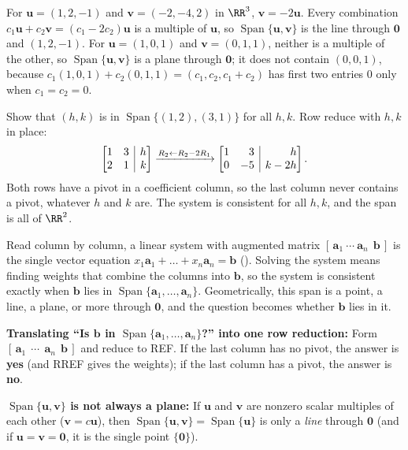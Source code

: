 \documentclass[10pt]{scrartcl}
\makeatletter
\newcommand{\aug}[2]{\left[\begin{array}{@{}#1@{}}#2\end{array}\right]}
\newcommand{\vv}[1]{\mathbf{#1}}
\DeclareMathOperator{\spn}{Span}
\makeatother
\begin{document}
\begin{example*}
For $\vv u=(1,2,-1)$ and $\vv v=(-2,-4,2)$ in $\RR^3$, $\vv v=-2\vv u$. Every combination $c_1\vv u+c_2\vv v=(c_1-2c_2)\vv u$ is a multiple of $\vv u$, so $\spn\{\vv u,\vv v\}$ is the line through $\vv 0$ and $(1,2,-1)$. For $\vv u=(1,0,1)$ and $\vv v=(0,1,1)$, neither is a multiple of the other, so $\spn\{\vv u,\vv v\}$ is a plane through $\vv 0$; it does not contain $(0,0,1)$, because $c_1(1,0,1)+c_2(0,1,1)=(c_1,c_2,c_1+c_2)$ has first two entries $0$ only when $c_1=c_2=0$.
\end{example*}

\begin{example*}
Show that $(h,k)$ is in $\spn\{(1,2),(3,1)\}$ for all $h,k$. Row reduce with $h,k$ in place:
\[
  \aug{rr|r}{1&3&h\\2&1&k}\xrightarrow{R_2\leftarrow R_2-2R_1}\aug{rr|r}{1&3&h\\0&-5&k-2h}.
\]
Both rows have a pivot in a coefficient column, so the last column never contains a pivot, whatever $h$ and $k$ are. The system is consistent for all $h,k$, and the span is all of $\RR^2$.
\end{example*}

\revisit
Read column by column, a linear system with augmented matrix $[\,\vv a_1\ \cdots\ \vv a_n\ \ \vv b\,]$ is the single vector equation $x_1\vv a_1+\dots+x_n\vv a_n=\vv b$ (). Solving the system means finding weights that combine the columns into $\vv b$, so the system is consistent exactly when $\vv b$ lies in $\spn\{\vv a_1,\dots,\vv a_n\}$. Geometrically, this span is a point, a line, a plane, or more through $\vv 0$, and the question becomes whether $\vv b$ lies in it.

\begin{shortcuts}
  \ii \textbf{Translating ``Is $\vv b$ in $\spn\{\vv a_1,\dots,\vv a_n\}$?'' into one row reduction:} Form $[\,\vv a_1\ \ \cdots\ \ \vv a_n\ \ \vv b\,]$ and reduce to REF. If the last column has no pivot, the answer is \textbf{yes} (and RREF gives the weights); if the last column has a pivot, the answer is \textbf{no}.
\end{shortcuts}

\begin{trapbox}
  \ii \textbf{$\spn\{\vv u,\vv v\}$ is not always a plane:} If $\vv u$ and $\vv v$ are nonzero scalar multiples of each other ($\vv v=c\vv u$), then $\spn\{\vv u,\vv v\}=\spn\{\vv u\}$ is only a \emph{line} through $\vv 0$ (and if $\vv u=\vv v=\vv 0$, it is the single point $\{\vv 0\}$).
\end{trapbox}
\end{document}
